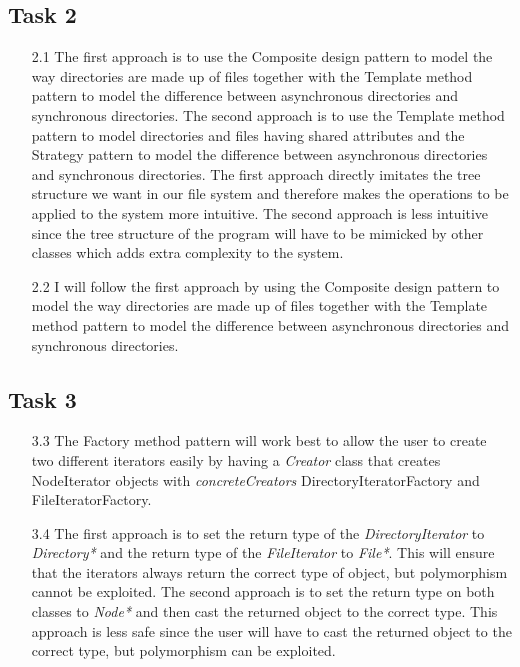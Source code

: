 \documentclass{article}
\begin{document}
\subsection*{Task 2}
\begin{itemize}
    \item[2.1]The first approach is to use the Composite design pattern to model the way directories are made up of files together with the Template method 
    pattern to model the difference between asynchronous directories and synchronous directories. The second approach is to use the Template method pattern 
    to model directories and files having shared attributes and the Strategy pattern to model the difference between asynchronous directories and synchronous
    directories. The first approach directly imitates the tree structure we want in our file system and therefore makes the operations to be applied to the system 
    more intuitive. The second approach is less intuitive since the tree structure of the program will have to be mimicked by other classes which adds extra 
    complexity to the system. 
    \item[2.2]I will follow the first approach by using the Composite design pattern to model the way directories are made up of files together with the Template
    method pattern to model the difference between asynchronous directories and synchronous directories.
\end{itemize}

\subsection*{Task 3}
\begin{itemize}
    \item[3.3]The Factory method pattern will work best to allow the user to create two different iterators 
    easily by having a \textit{Creator} class that creates NodeIterator objects with \textit{concreteCreators} DirectoryIteratorFactory and FileIteratorFactory.
    \item[3.4]The first approach is to set the return type of the \textit{DirectoryIterator} to \textit{Directory*} and the return type of the \textit{FileIterator}
    to \textit{File*}. This will ensure that the iterators always return the correct type of object, but polymorphism cannot be exploited. The second approach is to
    set the return type on both classes to \textit{Node*} and then cast the returned object to the correct type. This approach is less safe since the user will have to
    cast the returned object to the correct type, but polymorphism can be exploited.
\end{itemize}
\end{document}
